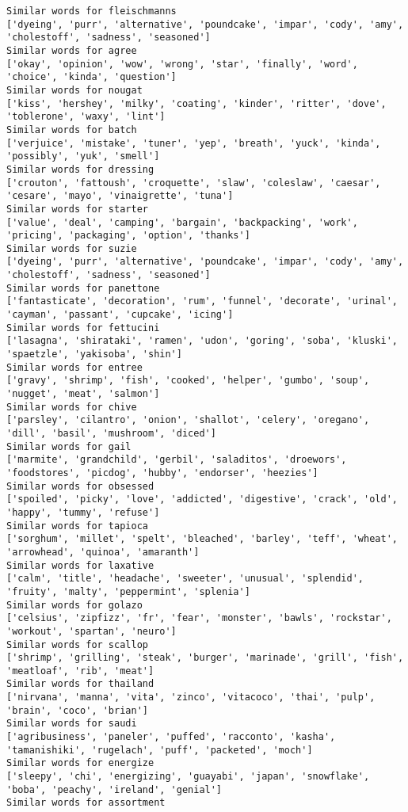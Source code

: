 \documentclass[11pt]{article}
\begin{document}
\begin{Verbatim}[commandchars=\\\{\}]
Similar words for fleischmanns
['dyeing', 'purr', 'alternative', 'poundcake', 'impar', 'cody', 'amy', 'cholestoff', 'sadness', 'seasoned']
Similar words for agree
['okay', 'opinion', 'wow', 'wrong', 'star', 'finally', 'word', 'choice', 'kinda', 'question']
Similar words for nougat
['kiss', 'hershey', 'milky', 'coating', 'kinder', 'ritter', 'dove', 'toblerone', 'waxy', 'lint']
Similar words for batch
['verjuice', 'mistake', 'tuner', 'yep', 'breath', 'yuck', 'kinda', 'possibly', 'yuk', 'smell']
Similar words for dressing
['crouton', 'fattoush', 'croquette', 'slaw', 'coleslaw', 'caesar', 'cesare', 'mayo', 'vinaigrette', 'tuna']
Similar words for starter
['value', 'deal', 'camping', 'bargain', 'backpacking', 'work', 'pricing', 'packaging', 'option', 'thanks']
Similar words for suzie
['dyeing', 'purr', 'alternative', 'poundcake', 'impar', 'cody', 'amy', 'cholestoff', 'sadness', 'seasoned']
Similar words for panettone
['fantasticate', 'decoration', 'rum', 'funnel', 'decorate', 'urinal', 'cayman', 'passant', 'cupcake', 'icing']
Similar words for fettucini
['lasagna', 'shirataki', 'ramen', 'udon', 'goring', 'soba', 'kluski', 'spaetzle', 'yakisoba', 'shin']
Similar words for entree
['gravy', 'shrimp', 'fish', 'cooked', 'helper', 'gumbo', 'soup', 'nugget', 'meat', 'salmon']
Similar words for chive
['parsley', 'cilantro', 'onion', 'shallot', 'celery', 'oregano', 'dill', 'basil', 'mushroom', 'diced']
Similar words for gail
['marmite', 'grandchild', 'gerbil', 'saladitos', 'droewors', 'foodstores', 'picdog', 'hubby', 'endorser', 'heezies']
Similar words for obsessed
['spoiled', 'picky', 'love', 'addicted', 'digestive', 'crack', 'old', 'happy', 'tummy', 'refuse']
Similar words for tapioca
['sorghum', 'millet', 'spelt', 'bleached', 'barley', 'teff', 'wheat', 'arrowhead', 'quinoa', 'amaranth']
Similar words for laxative
['calm', 'title', 'headache', 'sweeter', 'unusual', 'splendid', 'fruity', 'malty', 'peppermint', 'splenia']
Similar words for golazo
['celsius', 'zipfizz', 'fr', 'fear', 'monster', 'bawls', 'rockstar', 'workout', 'spartan', 'neuro']
Similar words for scallop
['shrimp', 'grilling', 'steak', 'burger', 'marinade', 'grill', 'fish', 'meatloaf', 'rib', 'meat']
Similar words for thailand
['nirvana', 'manna', 'vita', 'zinco', 'vitacoco', 'thai', 'pulp', 'brain', 'coco', 'brian']
Similar words for saudi
['agribusiness', 'paneler', 'puffed', 'racconto', 'kasha', 'tamanishiki', 'rugelach', 'puff', 'packeted', 'moch']
Similar words for energize
['sleepy', 'chi', 'energizing', 'guayabi', 'japan', 'snowflake', 'boba', 'peachy', 'ireland', 'genial']
Similar words for assortment

\end{Verbatim}
\end{document}
